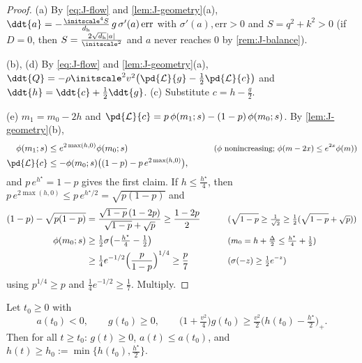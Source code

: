 \begin{proof}
(a) By \cref{eq:J-flow} and \cref{lem:J-geometry}(a), $\ddt{a}=-\frac{\initscale^4S}{d_{\mathrm h}}\,g\,\sigma'(a)\,\mathrm{err}$ with $\sigma'(a),\mathrm{err}>0$ and $S=q^2+k^2>0$ (if $D=0$, then $S=\frac{2\sqrt{d_{\mathrm h}}|a|}{\initscale^2}$ and $a$ never reaches $0$ by \cref{rem:J-balance}).

(b), (d) By \cref{eq:J-flow} and \cref{lem:J-geometry}(a), $\ddt{Q}=-\rho\initscale^2v^2\bigl(\pd{\mathcal L}{g}-\frac{1}{2}\pd{\mathcal L}{c}\bigr)$ and
$\ddt{h}=\ddt{c}+\frac{1}{2}\ddt{g}$. (c) Substitute $c=h-\frac{g}{2}$.

(e) $m_1=m_0-2h$ and $\pd{\mathcal L}{c}=p\,\phi(m_1;s)-(1-p)\,\phi(m_0;s)$. By \cref{lem:J-geometry}(b),
\begin{alignat*}{2}
 \phi(m_1;s)&\le e^{2\max(h,0)}\phi(m_0;s) &\qquad& \why{$\phi$ nonincreasing; $\phi(m-2x)\le e^{2x}\phi(m)$}\\
 \pd{\mathcal L}{c}&\le-\phi(m_0;s)\bigl((1-p)-p\,e^{2\max(h,0)}\bigr),
\end{alignat*}
and $p\,e^{h^\star}=1-p$ gives the first claim. If $h\le\frac{h^\star}{4}$, then $p\,e^{2\max(h,0)}\le p\,e^{h^\star/2}=\sqrt{p(1-p)}$ and
\begin{alignat*}{2}
 (1-p)-\sqrt{p(1-p)}&=\frac{\sqrt{1-p}\,(1-2p)}{\sqrt{1-p}+\sqrt p}\ge\frac{1-2p}{2} &\qquad& \text{\small($\sqrt{1-p}\ge\tfrac{1}{\sqrt2}\ge\tfrac{1}{2}(\sqrt{1-p}+\sqrt p)$)}\\
 \phi(m_0;s)&\ge\tfrac{1}{2}\sigma\bigl(-\tfrac{h^\star}{4}-\tfrac{1}{2}\bigr) && \text{\small($m_0=h+\tfrac{\Delta}{2}\le\tfrac{h^\star}{4}+\tfrac{1}{2}$)}\\
 &\ge\tfrac{1}{4}e^{-1/2}\Bigl(\frac{p}{1-p}\Bigr)^{1/4}\ge\frac{p}{7} && \text{\small($\sigma(-z)\ge\tfrac{1}{2}e^{-z}$)}
\end{alignat*}
using $p^{1/4}\ge p$ and $\frac{1}{4}e^{-1/2}\ge\frac{1}{7}$. Multiply.
\end{proof}

\begin{lemma}
\label{lem:J-align}
Let $t_0\ge0$ with
\[
 a(t_0)<0,\qquad g(t_0)\ge0,\qquad \bigl(1+\tfrac{v^2}{4}\bigr)g(t_0)\ge\tfrac{v^2}{2}\bigl(h(t_0)-\tfrac{h^\star}{2}\bigr)_+ .
\]
Then for all $t\ge t_0$: $g(t)\ge0$, $a(t)\le a(t_0)$, and $h(t)\ge h_0:=\min\{h(t_0),\frac{h^\star}{2}\}$.
\end{lemma}

